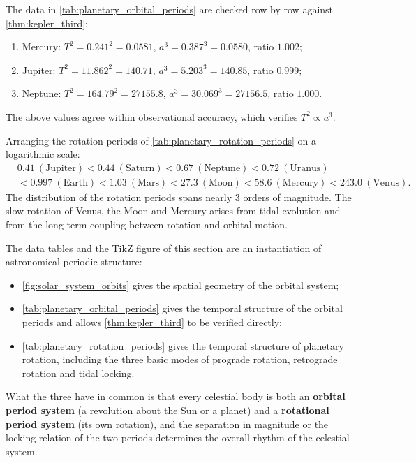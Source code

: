\begin{example}\label{ex:astro_solar_system_data}
The data in \cref{tab:planetary_orbital_periods} are checked row by row against \cref{thm:kepler_third}:
\begin{enumerate}[label=(\roman*)]
    \item Mercury: $T^2=0.241^2=0.0581$, $a^3=0.387^3=0.0580$, ratio $1.002$;
    \item Jupiter: $T^2=11.862^2=140.71$, $a^3=5.203^3=140.85$, ratio $0.999$;
    \item Neptune: $T^2=164.79^2=27155.8$, $a^3=30.069^3=27156.5$, ratio $1.000$.
\end{enumerate}
The above values agree within observational accuracy, which verifies $T^2\propto a^3$.
\end{example}

\begin{example}\label{ex:astro_rotation_multi_scale}
Arranging the rotation periods of \cref{tab:planetary_rotation_periods} on a logarithmic scale:
\[
\begin{aligned}
&0.41\ (\text{Jupiter})<0.44\ (\text{Saturn})<0.67\ (\text{Neptune})<0.72\ (\text{Uranus})\\
&<0.997\ (\text{Earth})<1.03\ (\text{Mars})<27.3\ (\text{Moon})<58.6\ (\text{Mercury})<243.0\ (\text{Venus}).
\end{aligned}
\]
The distribution of the rotation periods spans nearly $3$ orders of magnitude. The slow rotation of Venus, the Moon and Mercury arises from tidal evolution and from the long-term coupling between rotation and orbital motion.
\end{example}

\begin{remark}\label{rem:astro_data_organisation}
The data tables and the TikZ figure of this section are an instantiation of astronomical periodic structure:
\begin{itemize}
    \item \cref{fig:solar_system_orbits} gives the spatial geometry of the orbital system;
    \item \cref{tab:planetary_orbital_periods} gives the temporal structure of the orbital periods and allows \cref{thm:kepler_third} to be verified directly;
    \item \cref{tab:planetary_rotation_periods} gives the temporal structure of planetary rotation, including the three basic modes of prograde rotation, retrograde rotation and tidal locking.
\end{itemize}
What the three have in common is that every celestial body is both an \textbf{orbital period system} (a revolution about the Sun or a planet) and a \textbf{rotational period system} (its own rotation), and the separation in magnitude or the locking relation of the two periods determines the overall rhythm of the celestial system.
\end{remark}

